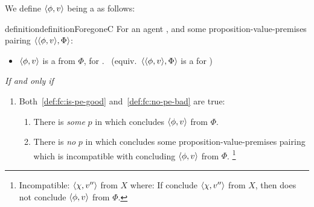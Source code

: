 \begin{note}[\fc{2} definition]
  We define \(\langle \phi, v \rangle\) being a \emph{} as follows:

  \begin{restatable}[\fc{3}]{definition}{definitionForegoneC}
    \label{def:fc}
    For an agent \vAgent{}, and some proposition-value-premises pairing \(\langle \langle \phi, v \rangle, \Phi \rangle\):

    \begin{itemize}
    \item
      \(\langle \phi, v \rangle\) is a \emph{} from \(\Phi\), for \vAgent{}.\newline
      \mbox{ }\hfill(equiv.\ \(\langle \langle \phi, v \rangle, \Phi \rangle\) is a  for \vAgent{})
    \end{itemize}
    \emph{If and only if}
    \begin{enumerate}[label=]
    \item
      Both~\ref{def:fc:is-pe-good} and~\ref{def:fc:no-pe-bad} are true:
      \begin{enumerate}[label=\alph*., ref=(\alph*)]
      \item
        \label{def:fc:is-pe-good}
        There is \emph{some} \pevent{} \(p\) in which \vAgent{} concludes \(\langle \phi, v \rangle\) from \(\Phi\).
      \item
        \label{def:fc:no-pe-bad}
        There is \emph{no} \pevent{} \(p\) in which \vAgent{} concludes some proposition-value-premises pairing which is incompatible with concluding \(\langle \phi, v \rangle\) from \(\Phi\).%
        \footnote{
          Incompatible:
          \(\langle \chi, v'' \rangle\) from \(X\) where:
        If conclude \(\langle \chi, v'' \rangle\) from \(X\), then does not conclude \(\langle \phi, v \rangle\) from \(\Phi\).
        }
      \end{enumerate}
    \end{enumerate}
    \vspace{-\baselineskip}
  \end{restatable}
\end{note}


